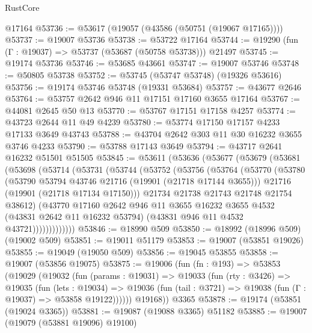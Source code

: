 \begin{lexlean}{RustCore}
\begin{coremodule}
    @17164
@53736 := @53617 (@19057 (@43586 (@50751 (@19067 @17165))))
@53737 := @19007 @53736
@53738 := @53722 @17164
@53744 := @19290 (fun (Γ : @19037) => @53737 (@53687 (@50758 @53738))) @21497
@53745 := @19174 @53736
@53746 := @53685 @43661
@53747 := @19007 @53746
@53748 := @50805 @53738
@53752 := @53745 (@53747 @53748) (@19326 @53616)
@53756 := @19174 @53746 @53748 (@19331 @53684)
@53757 := @43677 @2646
@53764 := @53757 @2642 @946 @11 @17151 @17160 @3655 @17164
@53767 := @44081 @2645 @50 @13
@53770 := @53767 @17151 @17158 @4257
@53774 := @43723 @2644 @11 @49 @4239
@53780 := @53774 @17150 @17157 @4233 @17133 @3649 @43743
@53788 := @43704 @2642 @303 @11 @30 @16232 @3655 @3746 @4233
@53790 := @53788 @17143 @3649
@53794 := @43717 @2641 @16232 @51501 @51505
@53845 := @53611
    (@53636
      (@53677
        (@53679
          (@53681
            (@53698
              (@53714
                (@53731
                  (@53744
                    (@53752
                      (@53756
                        (@53764
                          (@53770
                            (@53780
                              (@53790 @53794 @43746 @21716 (@19901 (@21718 @17144 @3655)))
                              @21716
                              (@19901 (@21718 @17134 @17150)))
                            @21734
                            @21738
                            @21743
                            @21748
                            @21754
                            @38612)
                          (@43770
                            @17160
                            @2642
                            @946
                            @11
                            @3655
                            @16232
                            @3655
                            @4532
                            (@43831 @2642 @11 @16232 @53794)
                            (@43831 @946 @11 @4532 @43721)))))))))))))
@53846 := @18990 @509
@53850 := @18992 (@18996 @509) (@19002 @509)
@53851 := @19011 @51179
@53853 := @19007 (@53851 @19026)
@53855 := @19049 (@19050 @509)
@53856 := @19045 @53855
@53858 := @19007 (@53856 @19075)
@53875 := @19006
    (fun (fn : @193) =>
    @53853
      (@19029
        (@19032
          (fun (params : @19031) =>
          @19033
            (fun (rty : @3426) =>
            @19035
              (fun (lets : @19034) =>
              @19036 (fun (tail : @3721) => @19038 (fun (Γ : @19037) => @53858 @19122))))))
        @19168))
    @3365
@53878 := @19174 (@53851 (@19024 @3365))
@53881 := @19087 (@19088 @3365) @51182
@53885 := @19007 (@19079 (@53881 @19096) @19100)

\end{coremodule}
\end{lexlean}
